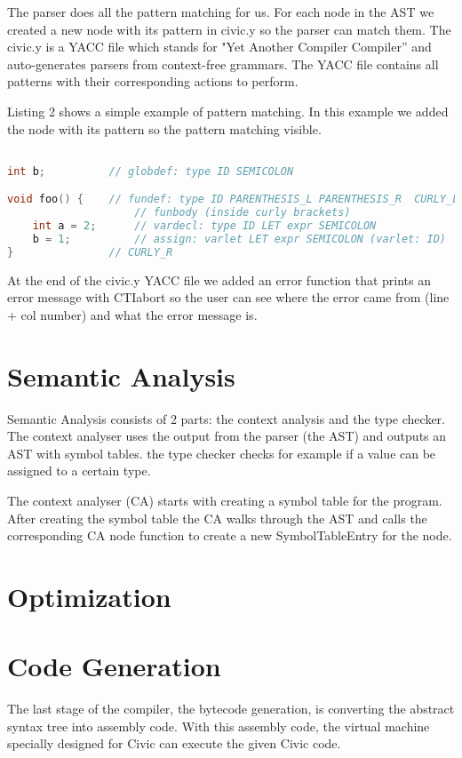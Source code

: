 \documentclass{uva-inf-article}
\begin{document}
The parser does all the pattern matching for us. For each node in the AST we created 
a new node with its pattern in civic.y so the parser can match them. The civic.y is a
YACC file which stands for "Yet Another Compiler Compiler” and auto-generates parsers
from context-free grammars. The YACC file contains all patterns with their corresponding
actions to perform.

Listing 2 shows a simple example of pattern matching. In this example we added the
node with its pattern so the pattern matching visible. 

\begin{lstlisting}[basicstyle=\small, language=C, label=lst:code, caption=Pattern matching Example, captionpos=b]

int b;          // globdef: type ID SEMICOLON

void foo() {    // fundef: type ID PARENTHESIS_L PARENTHESIS_R  CURLY_L
                    // funbody (inside curly brackets)
    int a = 2;      // vardecl: type ID LET expr SEMICOLON
    b = 1;          // assign: varlet LET expr SEMICOLON (varlet: ID)
}               // CURLY_R 
\end{lstlisting}

At the end of the civic.y YACC file we added an error function that prints an error message
with CTIabort so the user can see where the error came from (line + col number) and what
the error message is. 

\section{Semantic Analysis}
Semantic Analysis consists of 2 parts: the context analysis and the type checker. The context
analyser uses the output from the parser (the AST) and outputs an AST with symbol tables. the
type checker checks for example if a value can be assigned to a certain type. 

The context analyser (CA) starts with creating a symbol table for the program. After creating the
symbol table the CA walks through the AST and calls the corresponding CA node function to create 
a new SymbolTableEntry for the node.

\section{Optimization}

\newpage
\section{Code Generation}
\par The last stage of the compiler, the bytecode generation, is converting the abstract syntax tree into assembly code. 
With this assembly code, the virtual machine specially designed for Civic can execute the given Civic code.
\end{document}
